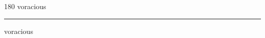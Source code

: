 
\begin{frame}
\begin{center}
\begin{turn}{180}
{\fontsize{2.5cm}{1em}\selectfont voracious}
\end{turn}
\vspace{1em}\par  
\hrule
\vspace{1em}\par  
{\fontsize{2.5cm}{1em}\selectfont voracious}
\end{center}
\end{frame}
